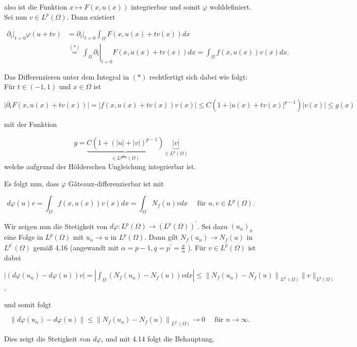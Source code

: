 \documentclass[10pt, letterpaper]{article}
\begin{document}
also ist die Funktion $x \mapsto F(x, u(x))$ integrierbar und somit $\varphi$ wohldefiniert. Sei nun $v \in L^{p}(\Omega)$. Dann existiert

$$
\begin{aligned}
\left.\partial_{t}\right|_{t=0} \varphi(u+t v) & =\left.\partial_{t}\right|_{t=0} \int_{\Omega} F(x, u(x)+t v(x)) d x \\
& \left.\stackrel{(*)}{=} \int_{\Omega} \partial_{t}\right|_{t=0} F(x, u(x)+t v(x)) d x=\int_{\Omega} f(x, u(x)) v(x) d x .
\end{aligned}
$$

Das Differenzieren unter dem Integral in $(*)$ rechtfertigt sich dabei wie folgt: Für $t \in(-1,1)$ und $x \in \Omega$ ist

$$
\left|\partial_{t} F(x, u(x)+t v(x))\right|=|f(x, u(x)+t v(x)) v(x)| \leq C\left(1+|u(x)+t v(x)|^{p-1}\right)|v(x)| \leq g(x)
$$

mit der Funktion

$$
g=\underbrace{C\left(1+(|u|+|v|)^{p-1}\right)}_{\in L^{\frac{p}{p-1}}(\Omega)} \underbrace{|v|}_{\in L^{p}(\Omega)}
$$
welche aufgrund der Hölderschen Ungleichung integrierbar ist.

Es folgt nun, dass $\varphi$ Gâteaux-differenzierbar ist mit

$$
d \varphi(u) v=\int_{\Omega} f(x, u(x)) v(x) d x=\int_{\Omega} N_{f}(u) v d x \quad \text { für } u, v \in L^{p}(\Omega) .
$$

Wir zeigen nun die Stetigkeit von $d \varphi: L^{p}(\Omega) \rightarrow\left(L^{p}(\Omega)\right)^{\prime}$. Sei dazu $\left(u_{n}\right)_{n}$ eine Folge in $L^{p}(\Omega)$ mit $u_{n} \rightarrow u$ in $L^{p}(\Omega)$. Dann gilt $N_{f}\left(u_{n}\right) \rightarrow N_{f}(u)$ in $L^{p^{\prime}}(\Omega)$ gemäß 4.16 (angewandt mit $\alpha=p-1, q=p^{\prime}=\frac{p}{\alpha}$ ). Für $v \in L^{p}(\Omega)$ ist dabei

$\left|\left(d \varphi\left(u_{n}\right)-d \varphi(u)\right) v\right|=\left|\int_{\Omega}\left(N_{f}\left(u_{n}\right)-N_{f}(u)\right) v d x\right| \leq\left\|N_{f}\left(u_{n}\right)-N_{f}(u)\right\|_{L^{p^{\prime}}(\Omega)}\|v\|_{L^{p}(\Omega)}$,

und somit folgt

$$
\left\|d \varphi\left(u_{n}\right)-d \varphi(u)\right\| \leq\left\|N_{f}\left(u_{n}\right)-N_{f}(u)\right\|_{L^{p^{\prime}}(\Omega)} \rightarrow 0 \quad \text { für } n \rightarrow \infty \text {. }
$$

Dies zeigt die Stetigkeit von $d \varphi$, und mit 4.14 folgt die Behauptung.
\end{document}
